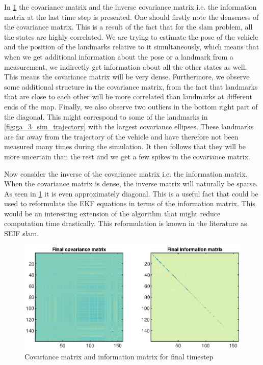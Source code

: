 In \cref{fig:ga_3_sim_P} the covariance matrix and the inverse covariance matrix i.e. the information matrix at the last time step is presented. One should firstly note the denseness of the covariance matrix. This is a result of the fact that for the \acrshort{slam} problem, all the states are highly correlated. We are trying to estimate the pose of the vehicle and the position of the landmarks relative to it simultaneously, which means that when we get additional information about the pose or a landmark from a measurement, we indirectly get information about all the other states as well. This means the covariance matrix will be very dense. Furthermore, we observe some additional structure in the covariance matrix, from the fact that landmarks that are close to each other will be more correlated than landmarks at different ends of the map. Finally, we also observe two outliers in the bottom right part of the diagonal. This might correspond to some of the landmarks in \cref{fig:ga_3_sim_trajectory} with the largest covariance ellipses. These landmarks are far away from the trajectory of the vehicle and have therefore not been measured many times during the simulation. It then follows that they will be more uncertain than the rest and we get a few spikes in the covariance matrix.

Now consider the inverse of the covariance matrix i.e. the information matrix. When the covariance matrix is dense, the inverse matrix will naturally be sparse. As seen in \cref{fig:ga_3_sim_P} it is even approximately diagonal. This is a useful fact that could be used to reformulate the EKF equations in terms of the information matrix. This would be an interesting extension of the algorithm that might reduce computation time drastically. This reformulation is known in the literature as SEIF \acrshort{slam}. 

\begin{figure}[!htb]
    \centering
    \includegraphics[width=0.7\linewidth]{figures/ga_3/sim_P.eps}
    \caption{Covariance matrix and information matrix for final timestep}
    \label{fig:ga_3_sim_P}
\end{figure}

